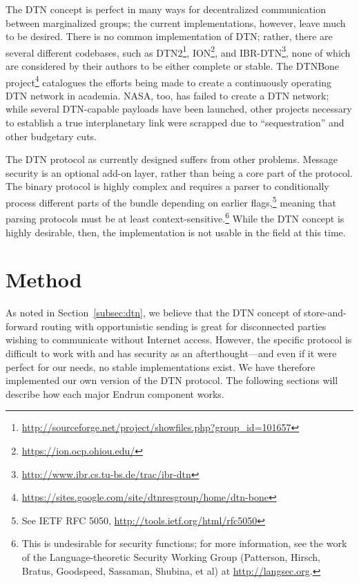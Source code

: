 \documentclass[12pt]{article}
\begin{document}
  The DTN concept is perfect in many ways for decentralized communication between marginalized groups; the current implementations, however, leave much to be desired. There is no common implementation of DTN; rather, there are several different codebases, such as DTN2\footnote{\url{http://sourceforge.net/project/showfiles.php?group_id=101657}}, ION\footnote{\url{https://ion.ocp.ohiou.edu/}}, and IBR-DTN\footnote{\url{http://www.ibr.cs.tu-bs.de/trac/ibr-dtn}}, none of which are considered by their authors to be either complete or stable. The DTNBone project\footnote{\url{https://sites.google.com/site/dtnresgroup/home/dtn-bone}} catalogues the efforts being made to create a continuously operating DTN network in academia. NASA, too, has failed to create a DTN network; while several DTN-capable payloads have been launched, other projects necessary to establish a true interplanetary link were scrapped due to ``sequestration'' and other budgetary cuts.
  
  The DTN protocol as currently designed suffers from other problems. Message security is an optional add-on layer, rather than being a core part of the protocol. The binary protocol is highly complex and requires a parser to conditionally process different parts of the bundle depending on earlier flags,\footnote{See IETF RFC 5050, \url{http://tools.ietf.org/html/rfc5050}} meaning that parsing protocols must be at least context-sensitive.\footnote{This is undesirable for security functions; for more information, see the work of the Language-theoretic Security Working Group (Patterson, Hirsch, Bratus, Goodspeed, Sassaman, Shubina, et al) at \url{http://langsec.org}.} While the DTN concept is highly desirable, then, the implementation is not usable in the field at this time.
  
  \section{Method}
  
  As noted in Section~\ref{subsec:dtn}, we believe that the DTN concept of store-and-forward routing with opportunistic sending is great for disconnected parties wishing to communicate without Internet access. However, the specific protocol is difficult to work with and has security as an afterthought---and even if it were perfect for our needs, no stable implementations exist. We have therefore implemented our own version of the DTN protocol. The following sections will describe how each major Endrun component works.
  
\end{document}
